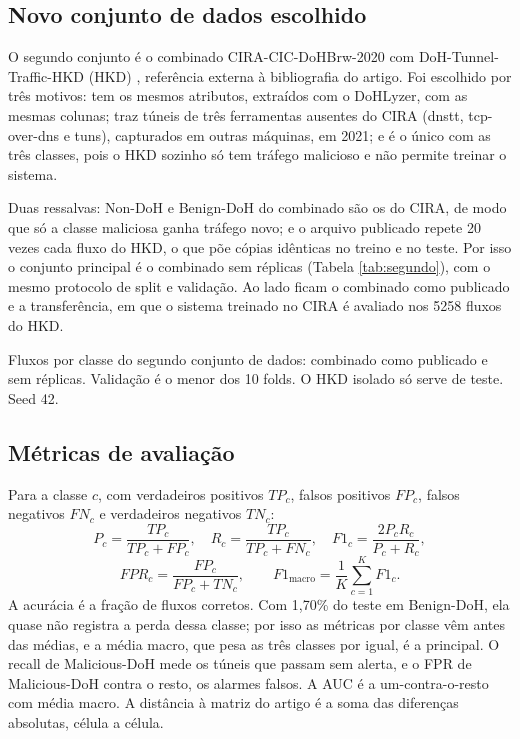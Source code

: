 \documentclass[conference]{IEEEtran}
\newcommand{\tabelacoluna}[1]{{\footnotesize\setlength{\tabcolsep}{3pt}%
  \begin{adjustbox}{max width=\columnwidth}\end{adjustbox}}}
\begin{document}
\subsection{Novo conjunto de dados escolhido}

O segundo conjunto é o combinado CIRA-CIC-DoHBrw-2020 com DoH-Tunnel-Traffic-HKD (HKD) \cite{mitsuhashi2023}, referência externa à bibliografia do artigo. Foi escolhido por três motivos: tem os mesmos atributos, extraídos com o DoHLyzer, com as mesmas colunas; traz túneis de três ferramentas ausentes do CIRA (dnstt, tcp-over-dns e tuns), capturados em outras máquinas, em 2021; e é o único com as três classes, pois o HKD sozinho só tem tráfego malicioso e não permite treinar o sistema.

Duas ressalvas: Non-DoH e Benign-DoH do combinado são os do CIRA, de modo que só a classe maliciosa ganha tráfego novo; e o arquivo publicado repete 20 vezes cada fluxo do HKD, o que põe cópias idênticas no treino e no teste. Por isso o conjunto principal é o combinado sem réplicas (Tabela \ref{tab:segundo}), com o mesmo protocolo de split e validação. Ao lado ficam o combinado como publicado e a transferência, em que o sistema treinado no CIRA é avaliado nos 5258 fluxos do HKD.

\begin{table}[!t]
\centering
\caption{Fluxos por classe do segundo conjunto de dados: combinado como publicado e sem réplicas. Validação é o menor dos 10 folds. O HKD isolado só serve de teste. Seed 42.}
\label{tab:segundo}
\tabelacoluna{dados_segundo_contagens}
\end{table}

\subsection{Métricas de avaliação}

Para a classe $c$, com verdadeiros positivos $TP_c$, falsos positivos $FP_c$, falsos negativos $FN_c$ e verdadeiros negativos $TN_c$:
\begin{equation}
P_c = \frac{TP_c}{TP_c + FP_c},\quad
R_c = \frac{TP_c}{TP_c + FN_c},\quad
F1_c = \frac{2 P_c R_c}{P_c + R_c},
\end{equation}
\begin{equation}
FPR_c = \frac{FP_c}{FP_c + TN_c},\qquad
F1_{\text{macro}} = \frac{1}{K}\sum_{c=1}^{K} F1_c .
\end{equation}
A acurácia é a fração de fluxos corretos. Com 1,70\% do teste em Benign-DoH, ela quase não registra a perda dessa classe; por isso as métricas por classe vêm antes das médias, e a média macro, que pesa as três classes por igual, é a principal. O recall de Malicious-DoH mede os túneis que passam sem alerta, e o FPR de Malicious-DoH contra o resto, os alarmes falsos. A AUC é a um-contra-o-resto com média macro. A distância à matriz do artigo é a soma das diferenças absolutas, célula a célula.
\end{document}
